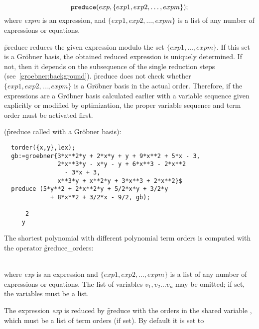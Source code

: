 \hypertarget{operator:PREDUCE}{}
\[
 \texttt{preduce}(exp, \{exp1, exp2,\ldots , expm\});
\]
where \emph{expm} is an expression, and $\{exp1, exp2, \ldots ,
expm\}$ is a list of any number of expressions or equations.

\f{preduce} reduces the given expression modulo the set $\{exp1,
\ldots , expm\}$. If this set is a Gr\"obner basis, the obtained reduced
expression is uniquely determined. If not, then it depends on the
subsequence of the single reduction steps
(see~\ref{groebner:background}). \f{preduce} does not check whether
$\{exp1, exp2, \ldots , expm\}$ is a Gr\"obner basis in the actual
order. Therefore, if the expressions are a Gr\"obner basis calculated
earlier with a variable sequence given explicitly or modified by
optimization, the proper variable sequence and term order must
be activated first.

\example (\f{preduce} called with a Gr\"obner basis):
\begin{verbatim}
  torder({x,y},lex);
  gb:=groebner{3*x**2*y + 2*x*y + y + 9*x**2 + 5*x - 3,
               2*x**3*y - x*y - y + 6*x**3 - 2*x**2
                 - 3*x + 3,
               x**3*y + x**2*y + 3*x**3 + 2*x**2}$
  preduce (5*y**2 + 2*x**2*y + 5/2*x*y + 3/2*y
             + 8*x**2 + 3/2*x - 9/2, gb);

      2
     y
\end{verbatim}

The shortest polynomial with different polynomial term orders is computed
with the operator \f{greduce\_orders}:

\begin{description}
\item[{\f{greduce\_orders}($exp$, \{$exp1$, $exp2$, \ldots , $expm$\}
    [,\{$v_1,v_2,\ldots,v_n$\}]);}]\mbox{}\\
  \hypertarget{operator:GREDUCE_ORDERS}{}
where \textit{exp} is an expression and $\{exp1, exp2,\ldots , expm\}$ is
a list of any number of expressions or equations. The list of variables
$v_1,v_2 \ldots v_n$ may be omitted; if set, the variables must be a list.
\end{description}

\hypertarget{reserved:GORDERS}{}
The expression \textit{exp} is reduced by \f{greduce} with the orders
in the shared variable , which must be a list of term
orders (if set). By default it is set to


